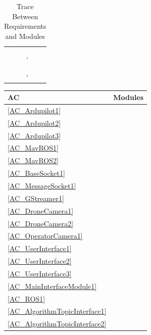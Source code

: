 \documentclass[12pt, titlepage]{article}
\begin{document}
\begin{table}[H]
\begin{tabular}{p{} p{}}
\nameref{SR_008}&  \\
\nameref{SR_009}&  \nameref{User Interface}, \nameref{Vision App} \\
\nameref{SR_010}&  \\
\nameref{SR_011}&  \nameref{Operation States} \\
\nameref{SR_012}&  \nameref{Operation States}, \nameref{User Interface} \\
\nameref{SR_013}&  \nameref{User Interface} \\
\bottomrule
\end{tabular}
\caption{Trace Between Requirements and Modules}
\end{table}

\begin{table}[H]
\centering
\begin{tabular}{p{} p{}}
\toprule
\textbf{AC} & \textbf{Modules}\\
\midrule
\ref{AC_Ardupilot1} & \nameref{Firmware} \\
\ref{AC_Ardupilot2} & \nameref{Firmware} \\
\ref{AC_Ardupilot3} & \nameref{Firmware} \\
\ref{AC_MavROS1} & \nameref{MavROS} \\
\ref{AC_MavROS2} & \nameref{MavROS} \\
\ref{AC_BaseSocket1} & \nameref{Base Socket} \\
\ref{AC_MessageSocket1} & \nameref{Message Socket} \\
\ref{AC_GStreamer1} & \nameref{GStreamer} \\
\ref{AC_DroneCamera1} & \nameref{Drone Camera} \\
\ref{AC_DroneCamera2} & \nameref{Drone Camera} \\
\ref{AC_OperatorCamera1} & \nameref{Operator Camera} \\
\ref{AC_UserInterface1} & \nameref{User Interface} \\
\ref{AC_UserInterface2} & \nameref{User Interface} \\
\ref{AC_UserInterface3} & \nameref{User Interface} \\
\ref{AC_MainInterfaceModule1} & \nameref{Main Interface Module} \\
\ref{AC_ROS1} & \nameref{ROS} \\
\ref{AC_AlgorithmTopicInterface1} & \nameref{Algorithm Topic Interface} \\
\ref{AC_AlgorithmTopicInterface2} & \nameref{Algorithm Topic Interface} \\

\end{tabular}
\end{table}
\end{document}
